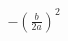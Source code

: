 \documentclass[preview]{standalone}
\begin{document}
\begin{align*}
-\left( \frac{b}{2a} \right)^{2}
\end{align*}
\end{document}
